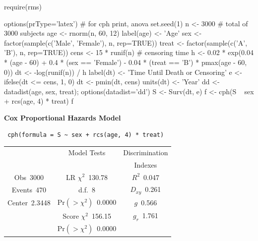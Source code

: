 \begin{Sinput}
require(rms)
\end{Sinput}
\begin{Sinput}
options(prType='latex')   # for cph print, anova
set.seed(1)
n <- 3000    # total of 3000 subjects
age <- rnorm(n, 60, 12)
label(age) <- 'Age'
sex   <- factor(sample(c('Male', 'Female'), n, rep=TRUE))
treat <- factor(sample(c('A', 'B'), n, rep=TRUE))
cens  <- 15 * runif(n)     # censoring time
h <- 0.02 * exp(0.04 * (age - 60) + 0.4 * (sex == 'Female') -  
                0.04 * (treat == 'B') * pmax(age - 60, 0))
dt <- -log(runif(n)) / h
label(dt) <- 'Time Until Death or Censoring'
e <- ifelse(dt <= cens, 1, 0)
dt <- pmin(dt, cens)
units(dt) <- 'Year'
dd <- datadist(age, sex, treat); options(datadist='dd')
S <- Surv(dt, e)
f <- cph(S ~ sex + rcs(age, 4) * treat)
f
\end{Sinput}

 \noindent \textbf{Cox Proportional Hazards Model}
 
 \begin{verbatim}
 cph(formula = S ~ sex + rcs(age, 4) * treat)
 \end{verbatim}
 
 {\selectfont \begin{center}\begin{tabular}{|c|c|c|}\hline
&Model Tests&Discrimination\\
&&Indexes\\\hline
Obs~\hfill 3000&LR $\chi^{2}$~\hfill 130.78&$R^{2}$~\hfill 0.047\\
Events~\hfill 470&d.f.~\hfill 8&$D_{xy}$~\hfill 0.261\\
Center~\hfill 2.3448&Pr$(>\chi^{2})$~\hfill 0.0000&$g$~\hfill 0.566\\
&Score $\chi^{2}$~\hfill 156.15&$g_{r}$~\hfill 1.761\\
&Pr$(>\chi^{2})$~\hfill 0.0000&\\
\hline
\end{tabular}
\end{center}}
 
